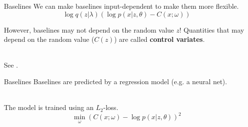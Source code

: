 \begin{frame}{Baselines}
We can make baselines input-dependent to make them more flexible.
\begin{equation*}
\log q(z|\lambda) \left( \log p(x|z,\theta) - C(x; \omega) \right)
\end{equation*}

\pause

However, baselines may not depend on the random value $ z $! Quantities that may depend on the
random value ($ C(z) $) are called \textbf{control variates}. \\

~

See \cite{PaisleyEtAl:2012, RanganathEtAl:2014,GregorEtAl:2014}.
\end{frame}

\begin{frame}{Baselines}
Baselines are predicted by a regression model (e.g. a neural net). \\

~

The model is trained using 
an $ L_{2} $-loss.
\begin{equation*}
\min_\omega \left(C(x; \omega) - \log p(x|z,\theta)\right)^{2}
\end{equation*}
\end{frame}




